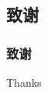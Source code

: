 \documentclass[CJK,notheorems,mathserif,table]{beamer}
\begin{document}
\begin{CJK*}{GBK}{kai}
\section{致谢}
\begin{frame}\frametitle{致谢}
Thanks
\end{frame}
\end{CJK*}
\end{document}
